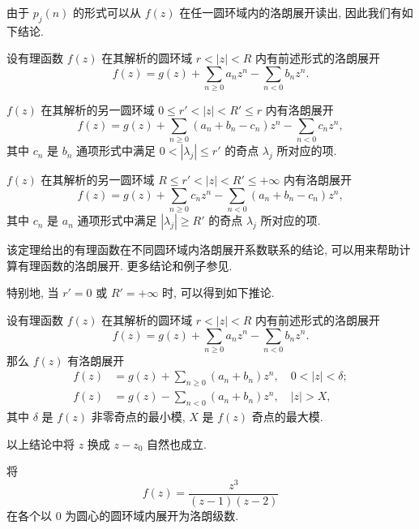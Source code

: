 由于 $p_j(n)$ 的形式可以从 $f(z)$ 在任一圆环域内的洛朗展开读出, 因此我们有如下结论.
  
\begin{theorem}
  \label{thm:rational-function-laurent}
  设有理函数 $f(z)$ 在其解析的圆环域 $r<|z|<R$ 内有前述形式的洛朗展开
  \[
    f(z)=g(z)+\sum_{n\ge 0} a_n z^n-\sum_{n<0} b_n z^n.
  \]
  \vspace{-\baselineskip}
  \begin{enuma}
    \item $f(z)$ 在其解析的另一圆环域 $0\le r'<|z|<R'\le r$ 内有洛朗展开
      \[
        f(z)=g(z)+\sum_{n\ge 0} (a_n+b_n-c_n) z^n-\sum_{n<0} c_n z^n,
      \]
      其中 $c_n$ 是 $b_n$ 通项形式中满足 $0<|\lambda_j|\le r'$ 的奇点 $\lambda_j$ 所对应的项.
    \item $f(z)$ 在其解析的另一圆环域 $R\le r'<|z|<R'\le+\infty$ 内有洛朗展开
    \[
      f(z)=g(z)+\sum_{n\ge 0} c_n z^n-\sum_{n<0} (a_n+b_n-c_n) z^n,
    \]
    其中 $c_n$ 是 $a_n$ 通项形式中满足 $|\lambda_j|\ge R'$ 的奇点 $\lambda_j$ 所对应的项.
  \end{enuma}
\end{theorem}
  
该定理给出的有理函数在不同圆环域内洛朗展开系数联系的结论, 可以用来帮助计算有理函数的洛朗展开. 
更多结论和例子参见\cite{YuanZhang2024}.

特别地, 当 $r'=0$ 或 $R'=+\infty$ 时, 可以得到如下推论. 

\begin{corollary}
  \label{cor:rational-function-laurent}
  设有理函数 $f(z)$ 在其解析的圆环域 $r<|z|<R$ 内有前述形式的洛朗展开
  \[
    f(z)=g(z)+\sum_{n\ge 0} a_n z^n-\sum_{n<0} b_n z^n.
  \]
  那么 $f(z)$ 有洛朗展开
  \begin{align*}
    f(z)&=g(z)+\sum_{n\ge 0} (a_n+b_n) z^n,\quad 0<|z|<\delta;\\
    f(z)&=g(z)-\sum_{n<0} (a_n+b_n) z^n,\quad |z|>X,
  \end{align*} 
  其中 $\delta$ 是 $f(z)$ 非零奇点的最小模, $X$ 是 $f(z)$ 奇点的最大模.
\end{corollary}

以上结论中将 $z$ 换成 $z-z_0$ 自然也成立.

\begin{example}
  将
  \[
    f(z)=\dfrac{z^3}{(z-1)(z-2)}
  \]
  在各个以 $0$ 为圆心的圆环域内展开为洛朗级数. 
\end{example}

